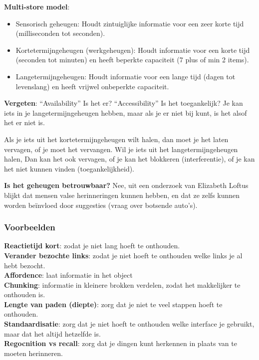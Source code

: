 \documentclass[nonacm, sigconf, balance=true]{acmart}
\begin{document}
    \textbf{Multi-store model}:
    \begin{itemize}
        \item Sensorisch geheugen: Houdt zintuiglijke informatie voor een zeer korte tijd (milliseconden tot seconden).
        \item Kortetermijngeheugen (werkgeheugen): Houdt informatie voor een korte tijd (seconden tot minuten) en heeft beperkte capaciteit (7 plus of min 2 items).
        \item Langetermijngeheugen: Houdt informatie voor een lange tijd (dagen tot levenslang) en heeft vrijwel onbeperkte capaciteit.
    \end{itemize}

    \textbf{Vergeten}: ``Availability'' Is het er?
    ``Accessibility'' Is het toegankelijk?
    Je kan iets in je langetermijngeheugen hebben, maar als je er niet bij kunt, is het alsof het er niet is.

    Als je iets uit het kortetermijngeheugen wilt halen, dan moet je het laten vervagen, of je moet het vervangen.
    Wil je iets uit het langetermijngeheugen halen, Dan kan het ook vervagen, of je kan het blokkeren (interferentie), of je kan het niet kunnen vinden (toegankelijkheid).

    \textbf{Is het geheugen betrouwbaar?} Nee, uit een onderzoek van Elizabeth Loftus blijkt dat mensen valse herinneringen kunnen hebben, en dat ze zelfs kunnen worden beïnvloed door suggesties (vraag over botsende auto's).\\

    \subsubsection{Voorbeelden}
    \textbf{Reactietijd kort}: zodat je niet lang hoeft te onthouden.\\
    \textbf{Verander bezochte links}: zodat je niet hoeft te onthouden welke links je al hebt bezocht.\\
    \textbf{Affordence}: laat informatie in het object\\
    \textbf{Chunking}: informatie in kleinere brokken verdelen, zodat het makkelijker te onthouden is.\\
    \textbf{Lengte van paden (diepte)}: zorg dat je niet te veel stappen hoeft te onthouden.\\
    \textbf{Standaardisatie}: zorg dat je niet hoeft te onthouden welke interface je gebruikt, maar dat het altijd hetzelfde is.\\
    \textbf{Regocnition vs recall}: zorg dat je dingen kunt herkennen in plaats van te moeten herinneren.\\
\end{document}
